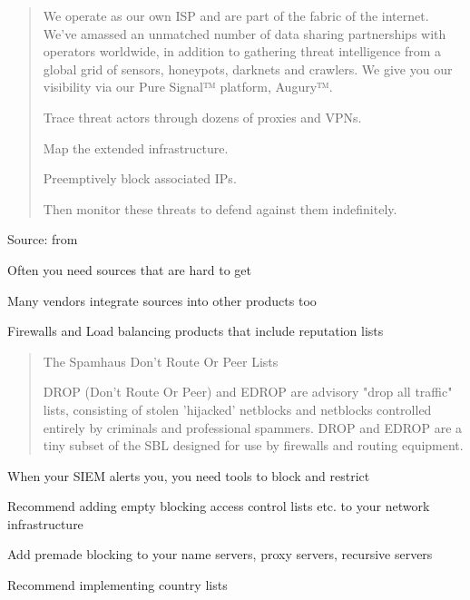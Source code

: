 \documentclass[Screen16to9,17pt]{foils}
\begin{document}


\begin{quote}
  We operate as our own ISP and are part of the fabric of the internet. We’ve amassed an unmatched number of data sharing partnerships with operators worldwide, in addition to gathering threat intelligence from a global grid of sensors, honeypots, darknets and crawlers. We give you our visibility via our Pure Signal™ platform, Augury™.

\begin{list2}
\item Trace threat actors through dozens of proxies and VPNs.
\item Map the extended infrastructure.
\item Preemptively block associated IPs.
\item Then monitor these threats to defend against them indefinitely.
\end{list2}
\end{quote}
Source: from 

\begin{list2}
\item Often you need sources that are hard to get
\item Many vendors integrate sources into other products too
\item Firewalls and Load balancing products that include reputation lists
\end{list2}


\begin{quote}
The Spamhaus Don't Route Or Peer Lists

DROP (Don't Route Or Peer) and EDROP are advisory "drop all traffic" lists, consisting of stolen 'hijacked' netblocks and netblocks controlled entirely by criminals and professional spammers. DROP and EDROP are a tiny subset of the SBL designed for use by firewalls and routing equipment.
\end{quote}



\begin{list2}
\item When your SIEM alerts you, you need tools to block and restrict
\item Recommend adding empty blocking access control lists etc. to your network infrastructure
\item Add premade blocking to your name servers, proxy servers, recursive servers
\item Recommend implementing country lists
\end{list2}
\end{document}
